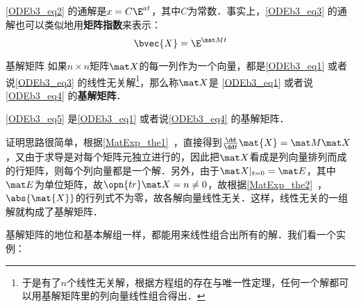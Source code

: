 \autoref{ODEb3_eq2} 的通解是$x=C\E^{at}$，其中$C$为常数．事实上，\autoref{ODEb3_eq3} 的通解也可以类似地用\textbf{矩阵指数}来表示：
\begin{equation}\label{ODEb3_eq5}
\bvec{X}=\E^{\mat Mt}
\end{equation}

\begin{definition}{基解矩阵}
如果$n\times n$矩阵$\mat X$的每一列作为一个向量，都是\autoref{ODEb3_eq1} 或者说\autoref{ODEb3_eq3} 的线性无关解\footnote{于是有了$n$个线性无关解，根据方程组的存在与唯一性定理，任何一个解都可以用基解矩阵里的列向量线性组合得出．}，那么称$\mat X$是 \autoref{ODEb3_eq1} 或者说\autoref{ODEb3_eq4} 的\textbf{基解矩阵}．
\end{definition}

\begin{theorem}{}
\autoref{ODEb3_eq5} 是\autoref{ODEb3_eq1} 或者说\autoref{ODEb3_eq4} 的基解矩阵．
\end{theorem}

证明思路很简单，根据\autoref{MatExp_the1}~，直接得到$\frac{\dd}{\dd t}\mat{X}=\mat M\mat X$，又由于求导是对每个矩阵元独立进行的，因此把$\mat X$看成是列向量排列而成的行矩阵，则每个列向量都是一个解．另外，由于$\mat X|_{t=0}=\mat E$，其中$\mat E$为单位矩阵，故$\opn{tr}\mat X=n\not=0$，故根据\autoref{MatExp_the2}~，$\abs{\mat{X}}$的行列式不为零，故各解向量线性无关．这样，线性无关的一组解就构成了基解矩阵．


基解矩阵的地位和基本解组一样，都能用来线性组合出所有的解．我们看一个实例：

